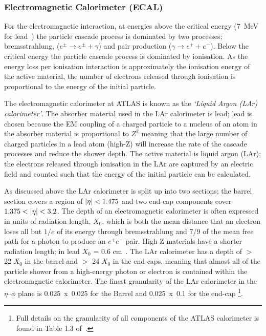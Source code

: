 \subsubsection{Electromagnetic Calorimeter (ECAL)}

For the electromagnetic interaction, at energies above the critical energy (\SI{7}{\MeV} for lead~\cite{obj-bjets_PDG})
the particle cascade process is dominated by two processes;
bremsstrahlung, ($e^{\pm} \to e^{\pm} + \gamma$) and pair production ($\gamma \to e^{+} + e^{-}$).
Below the critical energy the particle cascade process is dominated by ionisation.
As the energy loss per ionisation interaction is approximately the ionisation energy of the active material,
the number of electrons released through ionisation is proportional to the energy of the initial particle.

The electromagnetic calorimeter at ATLAS is known as the \textit{`Liquid Argon (LAr) calorimeter'}.
The absorber material used in the LAr calorimeter is lead;
lead is chosen because the EM coupling of a charged particle to a nucleus of an atom in the absorber material is proportional to $Z^2$
meaning that the large number of charged particles in a lead atom (high-Z) will increase the rate of the cascade processes and reduce the shower depth.
The active material is liquid argon (LAr);
the electrons released through ionisation in the LAr are captured by an electric field and counted
such that the energy of the initial particle can be calculated.

As discussed above the LAr calorimeter is split up into two sections;
the barrel section covers a region of $|\eta|\nobreak<\nobreak1.475$ and two end-cap components cover $1.375\nobreak<\nobreak|\eta|\nobreak<\nobreak3.2$.
The depth of an electromagnetic calorimeter is often expressed in units of radiation length, $X_{0}$,
which is both the mean distance that an electron loses all but  $1/e$ of its energy through bremsstrahlung
and 7/9 of the mean free path for a photon to produce an $e^+e^-$ pair.
High-Z materials have a shorter radiation length; in lead $X_0$ = 0.6 cm~\cite{obj-bjets_PDG}.
The LAr calorimeter has a depth of $>$ 22 $X_{0}$ in the barrel and $>$ 24 $X_{0}$ in the end-caps,
meaning that almost all of the particle shower from a high-energy photon
or electron is contained within the electromagnetic calorimeter.
The finest granularity of the LAr calorimeter in the $\eta$--$\phi$ plane
is \mbox{0.025~x~0.025} for the Barrel and 0.025~x~0.1 for the end-cap
\footnote{Full details on the granularity of all components of the ATLAS calorimeter is found in Table 1.3 of~\cite{det-ATLAS_Exp}.}. 

